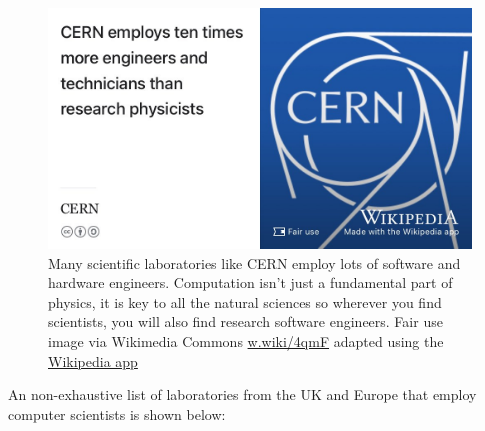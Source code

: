 \documentclass[
]{book}
\begin{document}
\begin{figure}

{\centering \includegraphics[width=1\linewidth]{images/cern-engineering} 

}

\caption{Many scientific laboratories like CERN employ lots of software and hardware engineers. Computation isn't just a fundamental part of physics, it is key to all the natural sciences so wherever you find scientists, you will also find research software engineers. Fair use image via Wikimedia Commons \href{https://w.wiki/4qmF}{w.wiki/4qmF} adapted using the \href{https://apps.apple.com/us/app/wikipedia/id324715238}{Wikipedia app}}\label{fig:cern-fig}
\end{figure}



An non-exhaustive list of laboratories from the UK and Europe that employ computer scientists is shown below:
\end{document}
